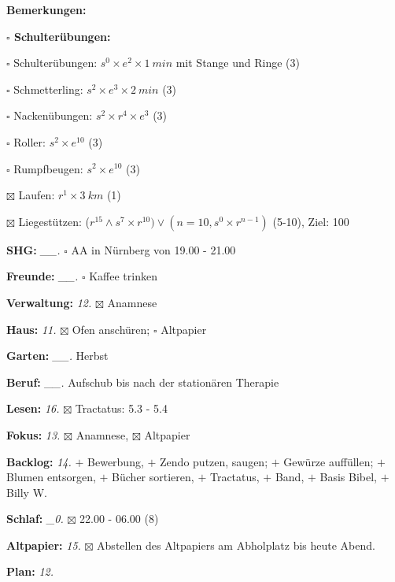 \documentclass[10pt,a4paper]{article}
\newcommand\prop[1] {{\color {alizarin} {\bf #1}}}             %
\newcommand\opti[1] {{\color {amethyst} {\bf #1}}}             %
\newcommand\mand[1] {{\color {burntorange} {\bf #1}}}          %
\newcommand\topspace{\vskip -15pt \hskip 20pt}
\newcommand\bottomspace{\vskip 4pt}
\newcommand\n[1] { {\sl #1.} \hskip 5pt }
\begin{document}
\begin{mdframed}[style=daystyle]
\begin{labeling}{{\mand {Bemerkungen:}}}
\begin{minipage}{0.75\textwidth}
\begin{labeling}{\prop {$\square$ {Schulterübungen:}}}
        \setlength\itemsep{-3pt}
      \item[$\square$ Schulterübungen:] $s^0 \times e^2 \times 1\ min$ mit Stange und Ringe (3)
      \item[$\square$ Schmetterling:]   $s^2 \times e^3 \times 2\ min$ (3)
      \item[$\square$ Nackenübungen:]   $s^2 \times r^4 \times e^3$ (3)
      \item[$\square$ Roller:]          $s^2 \times e^{10}$ (3)
      \item[$\square$ Rumpfbeugen:]     $s^2 \times e^{10}$ (3)
      \item[$\boxtimes$ Laufen:]          $r^1 \times 3\ km$ (1)
      \item[$\boxtimes$ Liegestützen:]    ($r^{15} \land s^7 \times r^{10}) \vee (n=10, s^0 \times r^{n-1})$ (5-10), Ziel: 100
      \end{labeling}
    \end{minipage}
    \bottomspace        
  \item[{\mand {SHG:}}]          \n{\_\_} $\square$ AA in Nürnberg von 19.00 - 21.00
  \item[{\mand {Freunde:}}]      \n{\_\_} $\square$ Kaffee trinken
  \item[{\mand {Verwaltung:}}]     \n{12} $\boxtimes$ Anamnese
  \item[{\mand {Haus:}}]           \n{11} $\boxtimes$ Ofen anschüren; $\square$ Altpapier
  \item[{\mand {Garten:}}]       \n{\_\_} Herbst
  \item[{\mand {Beruf:}}]        \n{\_\_} Aufschub bis nach der stationären Therapie
  \item[{\mand {Lesen:}}]          \n{16} $\boxtimes$ Tractatus: 5.3 - 5.4
  \item[{\mand {Fokus:}}]          \n{13} $\boxtimes$ Anamnese, $\boxtimes$ Altpapier
  \item[{\mand {Backlog:}}]        \n{14} 
    $+$ Bewerbung,
    $+$ Zendo putzen, saugen; $+$ Gewürze auffüllen; $+$ Blumen entsorgen, $+$ Bücher sortieren,
    $+$ Tractatus, $+$ Band, $+$ Basis Bibel, $+$ Billy W.
  \item[{\mand {Schlaf:}}]        \n{\_0} $\boxtimes$ 22.00 - 06.00 (8)
  \item[{\opti {Altpapier:}}]      \n{15} $\boxtimes$ Abstellen des Altpapiers am Abholplatz bis heute Abend.
  \item[{\mand {Plan:}}]           \n{12}
    \topspace
    \begin{minipage}{0.75\textwidth}  

\end{minipage}
\end{labeling}
\end{mdframed}
\end{document}
